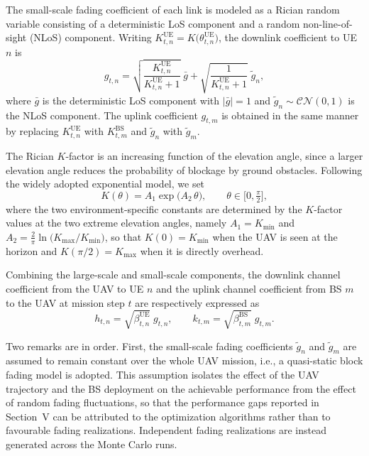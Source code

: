 \documentclass[conference]{IEEEtran}
\begin{document}
The small-scale fading coefficient of each link is modeled as a Rician
random variable consisting of a deterministic LoS component and a random
non-line-of-sight (NLoS) component. Writing
$K_{t,n}^{\mathrm{UE}}=K\big(\theta_{t,n}^{\mathrm{UE}}\big)$, the
downlink coefficient to UE $n$ is
\begin{equation}
g_{t,n}
=\sqrt{\frac{K_{t,n}^{\mathrm{UE}}}{K_{t,n}^{\mathrm{UE}}+1}}\;\bar{g}
+\sqrt{\frac{1}{K_{t,n}^{\mathrm{UE}}+1}}\;\tilde{g}_{n},
\end{equation}
where $\bar{g}$ is the deterministic LoS component with $|\bar{g}|=1$ and
$\tilde{g}_{n}\sim\mathcal{CN}(0,1)$ is the NLoS component. The uplink
coefficient $g_{t,m}$ is obtained in the same manner by replacing
$K_{t,n}^{\mathrm{UE}}$ with $K_{t,m}^{\mathrm{BS}}$ and $\tilde{g}_{n}$
with $\tilde{g}_{m}$.

The Rician $K$-factor is an increasing function of the elevation angle,
since a larger elevation angle reduces the probability of blockage by
ground obstacles. Following the widely adopted exponential model,
we set
\begin{equation}
K(\theta)=A_{1}\exp\!\big(A_{2}\,\theta\big),
\qquad \theta\in\big[0,\tfrac{\pi}{2}\big],
\end{equation}
where the two environment-specific constants are determined by the
$K$-factor values at the two extreme elevation angles, namely
$A_{1}=K_{\min}$ and
$A_{2}=\frac{2}{\pi}\ln\!\big(K_{\max}/K_{\min}\big)$, so that
$K(0)=K_{\min}$ when the UAV is seen at the horizon and
$K(\pi/2)=K_{\max}$ when it is directly overhead.

Combining the large-scale and small-scale components, the downlink
channel coefficient from the UAV to UE $n$ and the uplink channel
coefficient from BS $m$ to the UAV at mission step $t$ are respectively
expressed as
\begin{equation}
h_{t,n}=\sqrt{\beta_{t,n}^{\mathrm{UE}}}\;g_{t,n},
\qquad
k_{t,m}=\sqrt{\beta_{t,m}^{\mathrm{BS}}}\;g_{t,m}.
\end{equation}

Two remarks are in order. First, the small-scale fading coefficients
$\tilde{g}_{n}$ and $\tilde{g}_{m}$ are assumed to remain constant over
the whole UAV mission, i.e., a quasi-static block fading model is
adopted. This assumption isolates the effect of the UAV trajectory and
the BS deployment on the achievable performance from the effect of
random fading fluctuations, so that the performance gaps reported in
Section~V can be attributed to the optimization algorithms rather than to
favourable fading realizations. Independent fading realizations are
instead generated across the Monte Carlo runs.
\end{document}

